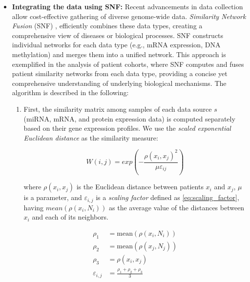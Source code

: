 \begin{itemize}[]
    \item \textbf{Integrating the data using SNF:} Recent advancements in data collection allow cost-effective gathering of diverse genome-wide data. \textit{Similarity Network Fusion} (SNF) \cite{wang2014similarity}, efficiently combines these data types, creating a comprehensive view of diseases or biological processes. SNF constructs individual networks for each data type (e.g., mRNA expression, DNA methylation) and merges them into a unified network. This approach is exemplified in the analysis of patient cohorts, where SNF computes and fuses patient similarity networks from each data type, providing a concise yet comprehensive understanding of underlying biological mechanisms. The algorithm is described in the following:

    \begin{enumerate}[\IEEEsetlabelwidth{12)}]
        \item First, the similarity matrix among samples of each data source $s$ (miRNA, mRNA, and protein expression data) is computed separately based on their gene expression profiles. We use the \textit{scaled exponential Euclidean distance} \cite{wang2014similarity} as the similarity measure:

        \begin{equation}
            \label{eq:scaled_exponential_sim}
            W(i,j) = exp \left(- \frac{\rho(x_i,x_j)^2}{\mu \varepsilon_{ij}}\right)
        \end{equation}

        where $\rho(x_i, x_j)$ is the Euclidean distance between patients $x_i$ and $x_j$, $\mu$ is a parameter, and $\varepsilon_{i,j}$ is a \textit{scaling factor} defined as \eqref{eq:scaling_factor}, having $mean(\rho(x_i, N_i))$ as the average value of the distances between $x_i$ and each of its neighbors.

        \begin{equation}
            \begin{aligned}
                \label{eq:scaling_factor}
                \rho_{1} &= \text{mean}(\rho(x_i, N_i)) \\
                \rho_{2} &= \text{mean}(\rho(x_j, N_j)) \\
                \rho_{3} &= \rho(x_i, x_j) \\
                \varepsilon_{i,j} &= \frac{\rho_{1} + \rho_{2} + \rho_{3}}{3}
            \end{aligned}
        \end{equation}


\end{enumerate}
\end{itemize}
